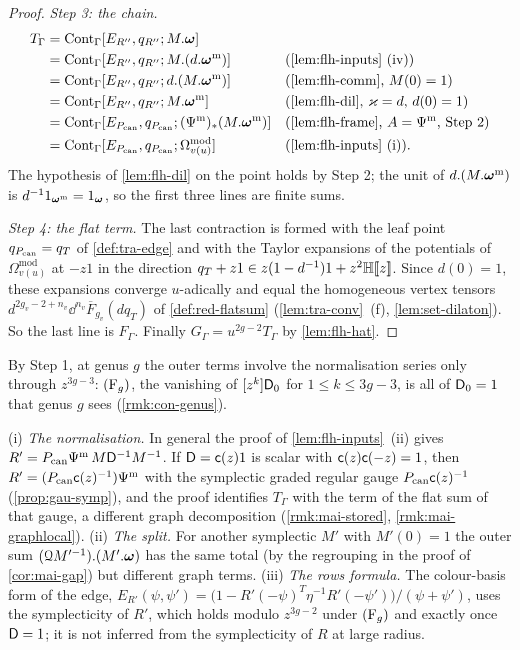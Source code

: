 \begin{proof}
\emph{Step 3: the chain.}
\begin{align*}
T_\Gamma&=\mathrm{Cont}_\Gamma[E_{R''},q_{R''};M.\TFT]&&\\
&=\mathrm{Cont}_\Gamma[E_{R''},q_{R''};M.(d.\TFT^{\mathrm m})]&&\text{(\cref{lem:flh-inputs}~(iv))}\\
&=\mathrm{Cont}_\Gamma[E_{R''},q_{R''};d.(M.\TFT^{\mathrm m})]&&\text{(\cref{lem:flh-comm}, $M(0)=1$)}\\
&=\mathrm{Cont}_\Gamma[E_{R''},q_{R''};M.\TFT^{\mathrm m}]&&\text{(\cref{lem:flh-dil}, $\varkappa=d$, $d(0)=1$)}\\
&=\mathrm{Cont}_\Gamma[E_{\Pc},q_{\Pc};(\Psi^{\mathrm m})_*(M.\TFT^{\mathrm m})]&&\text{(\cref{lem:flh-frame}, $A=\Psi^{\mathrm m}$, Step 2)}\\
&=\mathrm{Cont}_\Gamma[E_{\Pc},q_{\Pc};\Omega^{\mathrm{mod}}_{v(u)}]&&\text{(\cref{lem:flh-inputs}~(i))}.
\end{align*}
The hypothesis of \cref{lem:flh-dil} on the point holds by Step 2; the unit of $d.(M.\boldsymbol{\omega}^{\mathrm m})$ is $d^{-1}1_{\boldsymbol{\omega}^{\mathrm m}}=1_{\boldsymbol{\omega}}$, so the first three lines are finite sums.

\emph{Step 4: the flat term.} The last contraction is formed with the leaf point $q_{P_{\mathrm{can}}}=q_T$ of \cref{def:tra-edge} and with the Taylor expansions of the potentials of $\Omega^{\mathrm{mod}}_{v(u)}$ at $-z1$ in the direction $q_T+z1\in z(1-d^{-1})1+z^2\mathbb{H}[\![ z ]\!]$. Since $d(0)=1$, these expansions converge $u$-adically and equal the homogeneous vertex tensors $d^{2g_v-2+n_v}\dd^{n_v}\overline F_{g_v}(dq_T)$ of \cref{def:red-flatsum} (\cref{lem:tra-conv}~(f), \cref{lem:set-dilaton}). So the last line is $F_\Gamma$. Finally $G_\Gamma=u^{2g-2}T_\Gamma$ by \cref{lem:flh-hat}.
\end{proof}

By Step 1, at genus $g$ the outer terms involve the normalisation series only through $z^{3g-3}$: $(\mathrm{F}_{g})$, the vanishing of $[z^k]\mathsf{D}_0$ for $1\leq k\leq 3g-3$, is all of $\mathsf{D}_0=1$ that genus $g$ sees (\cref{rmk:con-genus}).

\begin{rmk}
\label{rmk:flh-fail}
(i) \emph{The normalisation.} In general the proof of \cref{lem:flh-inputs}~(ii) gives $R'=P_{\mathrm{can}}\Psi^{\mathrm m}\,M\mathsf{D}^{-1}M^{-1}$. If $\mathsf{D}=\mathsf{c}(z)1$ is scalar with $\mathsf{c}(z)\mathsf{c}(-z)=1$, then $R'=(P_{\mathrm{can}}\mathsf{c}(z)^{-1})\Psi^{\mathrm m}$ with the symplectic graded regular gauge $P_{\mathrm{can}}\mathsf{c}(z)^{-1}$ (\cref{prop:gau-symp}), and the proof identifies $T_\Gamma$ with the term of the flat sum of that gauge, a different graph decomposition (\cref{rmk:mai-stored}, \cref{rmk:mai-graphlocal}). (ii) \emph{The split.} For another symplectic $M'$ with $M'(0)=1$ the outer sum $(\mathcal{Q} M'^{-1}).(M'.\boldsymbol{\omega})$ has the same total (by the regrouping in the proof of \cref{cor:mai-gap}) but different graph terms. (iii) \emph{The rows formula.} The colour-basis form of the edge, $E_{R'}(\psi,\psi')=\bigl(1-R'(-\psi)^T\eta^{-1}R'(-\psi')\bigr)/(\psi+\psi')$, uses the symplecticity of $R'$, which holds modulo $z^{3g-2}$ under $(\mathrm{F}_{g})$ and exactly once $\mathsf{D}=1$; it is not inferred from the symplecticity of $R$ at large radius.
\end{rmk}
